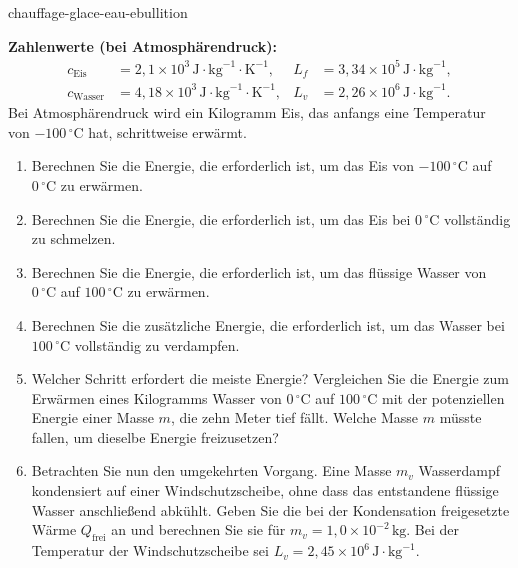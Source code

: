 
\begin{exo}{chauffage-glace-eau-ebullition}

\textbf{Zahlenwerte (bei Atmosphärendruck):}
\[
\begin{aligned}
c_{\text{Eis}} &= 2{,}1\times10^3\,\text{J}\!\cdot\!\text{kg}^{-1}\!\cdot\!\text{K}^{-1},
& L_f &= 3{,}34\times10^5\,\text{J}\!\cdot\!\text{kg}^{-1},\\
c_{\text{Wasser}} &= 4{,}18\times10^3\,\text{J}\!\cdot\!\text{kg}^{-1}\!\cdot\!\text{K}^{-1},
& L_v &= 2{,}26\times10^6\,\text{J}\!\cdot\!\text{kg}^{-1}.
\end{aligned}
\]
Bei Atmosphärendruck wird ein Kilogramm Eis, das anfangs eine Temperatur von $-100\,{}^\circ\text{C}$ hat, schrittweise erwärmt.

\begin{enumerate}
  \item Berechnen Sie die Energie, die erforderlich ist, um das Eis von $-100\,{}^\circ\text{C}$ auf $0\,{}^\circ\text{C}$ zu erwärmen.
  \item Berechnen Sie die Energie, die erforderlich ist, um das Eis bei $0\,{}^\circ\text{C}$ vollständig zu schmelzen.
  \item Berechnen Sie die Energie, die erforderlich ist, um das flüssige Wasser von $0\,{}^\circ\text{C}$ auf $100\,{}^\circ\text{C}$ zu erwärmen.
  \item Berechnen Sie die zusätzliche Energie, die erforderlich ist, um das Wasser bei $100\,{}^\circ\text{C}$ vollständig zu verdampfen.
  \item Welcher Schritt erfordert die meiste Energie? Vergleichen Sie die Energie zum Erwärmen eines Kilogramms Wasser von $0\,{}^\circ\text{C}$ auf $100\,{}^\circ\text{C}$ mit der potenziellen Energie einer Masse $m$, die zehn Meter tief fällt. Welche Masse $m$ müsste fallen, um dieselbe Energie freizusetzen?
  \item Betrachten Sie nun den umgekehrten Vorgang. Eine Masse $m_v$ Wasserdampf kondensiert auf einer Windschutzscheibe, ohne dass das entstandene flüssige Wasser anschließend abkühlt. Geben Sie die bei der Kondensation freigesetzte Wärme $Q_{\text{frei}}$ an und berechnen Sie sie für $m_v=1{,}0\times10^{-2}\,\text{kg}$. Bei der Temperatur der Windschutzscheibe sei $L_v=2{,}45\times10^6\,\text{J}\!\cdot\!\text{kg}^{-1}$.
\end{enumerate}


\end{exo}
